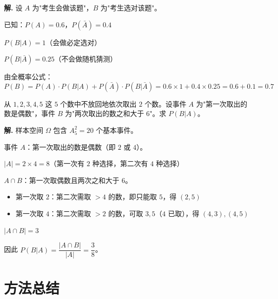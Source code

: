 \documentclass[11pt]{ctexrep}
\begin{document}
\textbf{解.} 设 $A$ 为"考生会做该题"，$B$ 为"考生选对该题"。

已知：$P(A) = 0.6$，$P(\bar{A}) = 0.4$

$P(B | A) = 1$（会做必定选对）

$P(B | \bar{A}) = 0.25$（不会做随机猜测）

由全概率公式：
\[
    P(B) = P(A) \cdot P(B | A) + P(\bar{A}) \cdot P(B | \bar{A}) = 0.6 \times 1 + 0.4 \times 0.25 = 0.6 + 0.1 = 0.7
\]

\begin{example}[条件概率与古典概型综合]
    从 $1, 2, 3, 4, 5$ 这 $5$ 个数中不放回地依次取出 $2$ 个数。设事件 $A$ 为"第一次取出的数是偶数"，事件 $B$ 为"两次取出的数之和大于 $6$"。求 $P(B | A)$。
\end{example}

\textbf{解.} 样本空间 $\Omega$ 包含 $A_5^2 = 20$ 个基本事件。

事件 $A$：第一次取出的数是偶数（即 $2$ 或 $4$）。

$|A| = 2 \times 4 = 8$（第一次有 $2$ 种选择，第二次有 $4$ 种选择）

$A \cap B$：第一次取偶数且两次之和大于 $6$。
\begin{itemize}
    \item 第一次取 $2$：第二次需取 $> 4$ 的数，即只能取 $5$，得 $(2, 5)$
    \item 第一次取 $4$：第二次需取 $> 2$ 的数，可取 $3, 5$（$4$ 已取），得 $(4, 3), (4, 5)$
\end{itemize}

$|A \cap B| = 3$

因此 $P(B | A) = \dfrac{|A \cap B|}{|A|} = \dfrac{3}{8}$。

\section*{方法总结}
\end{document}
